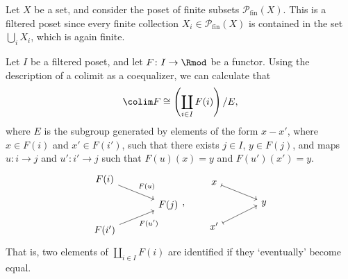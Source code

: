 \documentclass[main.tex]{subfiles}
\begin{document}
\begin{example}
  \label{eg:poset_of_finite_subsets}
  Let $X$ be a set, and consider the poset of finite subsets $\mathcal{P}_{\mathrm{fin}}(X)$. This is a filtered poset since every finite collection $X_{i} \in \mathcal{P}_{\mathrm{fin}}(X)$ is contained in the set $\bigcup_{i} X_{i}$, which is again finite.
\end{example}

Let $I$ be a filtered poset, and let $F\colon I \to \Rmod$ be a functor. Using the description of a colimit as a coequalizer, we can calculate that
\begin{equation*}
  \colim F \cong \left( \coprod_{i \in I} F(i) \right) / E,
\end{equation*}
where $E$ is the subgroup generated by elements of the form $x - x'$, where $x \in F(i)$ and $x' \in F(i')$, such that there exists $j \in I$, $y \in F(j)$, and maps $u\colon i \to j$ and $u'\colon i' \to j$ such that $F(u)(x) = y$ and $F(u')(x') = y$.
\begin{equation*}
  \begin{tikzcd}[row sep=small, column sep=large]
    F(i)
    \arrow[dr, "F(u)"]
    \\
    & F(j)
    \\
    F(i')
    \arrow[ur, swap, "F(u')"]
  \end{tikzcd}
  ,\qquad
  \begin{tikzcd}[row sep=small, column sep=large]
    x
    \arrow[dr, mapsto]
    \\
    & y
    \\
    \arrow[ur, mapsto]
    x'
  \end{tikzcd}
\end{equation*}
That is, two elements of $\coprod_{i \in I} F(i)$ are identified if they `eventually' become equal.
\end{document}
